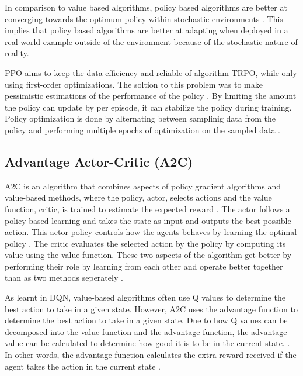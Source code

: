 In comparison to value based algorithms, policy based algorithms are better at converging towards the optimum policy within stochastic environments \cite{mnih2015human}. This implies that policy based algorithms are better at adapting when deployed in a real world example outside of the environment because of the stochastic nature of reality. 

PPO aims to keep the data efficiency and reliable of algorithm TRPO, while only using first-order optimizations. The soltion to this problem was to make pessimistic estimations of the performance of the policy \cite{schulman2017proximal}. By limiting the amount the policy can update by per episode, it can stabilize the policy during training. Policy optimization is done by alternating between samplinig data from the policy and performing multiple epochs of optimization on the sampled data \cite{schulman2017proximal}. 

\subsection{Advantage Actor-Critic (A2C)}

A2C is an algorithm that combines aspects of policy gradient algorithms and value-based methods, where the policy, actor, selects actions and the value function, critic, is trained to estimate the expected reward \cite{mnih2013playing}. The actor follows a policy-based learning and takes the state as input and outputs the best possible action. This actor policy controls how the agents behaves by learning the optimal policy \cite{SergiosKaragiannakos2018}. The critic evaluates the selected action by the policy by computing its value using the value function. These two aspects of the algorithm get better by performing their role by learning from each other and operate better together than as two methods seperately \cite{SergiosKaragiannakos2018}. 

As learnt in DQN, value-based algorithms often use Q values to determine the best action to take in a given state. However, A2C uses the advantage function to determine the best action to take in a given state. Due to how Q values can be decomposed into the value function and the advantage function, the advantage value can be calculated to determine how good it is to be in the current state. \cite{SergiosKaragiannakos2018}. In other words, the advantage function calculates the extra reward received if the agent takes the action in the current state \cite{ThomasSimonini2022A2C}.

